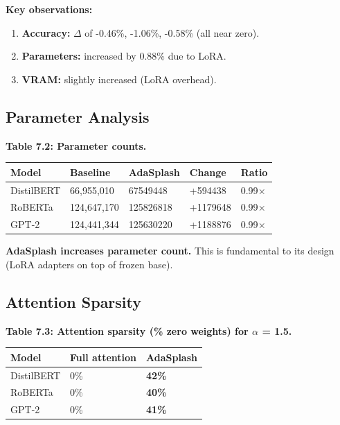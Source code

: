 \textbf{Key observations:}

\begin{enumerate}
\item \textbf{Accuracy:} $\Delta$ of -0.46\%, -1.06\%, -0.58\% (all near zero).
\item \textbf{Parameters:} increased by 0.88\% due to LoRA.
\item \textbf{VRAM:} slightly increased (LoRA overhead).

\end{enumerate}
\subsection{Parameter Analysis}

\textbf{Table 7.2: Parameter counts.}

\begin{table}[H]
\centering
\small
\begin{tabular}{lllll}
\toprule
\textbf{Model} & \textbf{Baseline} & \textbf{AdaSplash} & \textbf{Change} & \textbf{Ratio} \\
\midrule
DistilBERT & 66,955,010 & 67549448 & +594438 & 0.99$\times$ \\
RoBERTa & 124,647,170 & 125826818 & +1179648 & 0.99$\times$ \\
GPT-2 & 124,441,344 & 125630220 & +1188876 & 0.99$\times$ \\
\bottomrule
\end{tabular}
\end{table}

\textbf{AdaSplash increases parameter count.} This is fundamental to its design 
(LoRA adapters on top of frozen base).

\subsection{Attention Sparsity}

\textbf{Table 7.3: Attention sparsity (\% zero weights) for $\alpha$ = 1.5.}

\begin{table}[H]
\centering
\small
\begin{tabular}{lll}
\toprule
\textbf{Model} & \textbf{Full attention} & \textbf{AdaSplash} \\
\midrule
DistilBERT & 0\% & \textbf{42\%} \\
RoBERTa & 0\% & \textbf{40\%} \\
GPT-2 & 0\% & \textbf{41\%} \\
\bottomrule
\end{tabular}
\end{table}

